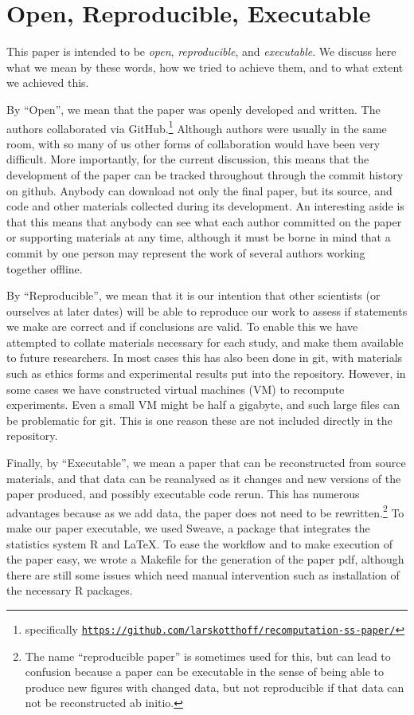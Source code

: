 \section{Open, Reproducible, Executable}

This paper is intended to be \emph{open}, 
\emph{reproducible}, and \emph{executable}.  We discuss here what we mean by these words, how we tried to achieve them, and to what extent we achieved this.

By ``Open'', we mean that the paper was openly developed and written.  The authors collaborated via GitHub.\footnote{specifically
\texttt{\url{https://github.com/larskotthoff/recomputation-ss-paper/}}}   Although authors were usually in the same room, with so many of us other forms of collaboration would have been very 
difficult.  More importantly, for the current discussion, this means that the development of the paper can be tracked throughout through the commit history on github.  Anybody can download not only the final paper, but its source, and code and other materials collected during its development.  An interesting aside is that this means that anybody can see what each author committed on the paper or supporting materials at any time, although it must be borne in mind that a commit by one person may represent the work of several authors working together offline.

By ``Reproducible'', we mean that it is our intention that other scientists (or ourselves at later dates) will be able to reproduce our work to assess if statements we make are correct and if conclusions are valid.  To enable this we have attempted to collate materials necessary for each study, and make them available to future researchers.  In most cases this has also been done in git, 
with materials such as ethics forms and experimental results put into the repository.  However, in some cases we have constructed virtual machines (VM) to recompute experiments.  Even a small VM 
might be half a gigabyte, and such large files can be problematic for git.  This is one reason these are not included directly in the repository.

Finally, by ``Executable'', we mean a paper that can be reconstructed from source 
materials, and that data can be reanalysed as it changes and new versions of the paper produced, and possibly executable code rerun.  
This has numerous advantages because as we add data, the paper does not need to be rewritten.\footnote{The name ``reproducible paper'' is sometimes used for this, but can lead to confusion because a paper can be executable in the sense of being able to produce new figures with 
changed data, but not reproducible if that data can not be reconstructed ab initio.}
To make our paper executable, we used Sweave, a package that integrates the statistics system R and \LaTeX. 
To ease the workflow and to make execution of the paper easy, we wrote a Makefile for the generation of the paper pdf, although there are still some issues which need manual intervention such as installation of the necessary R packages. 

